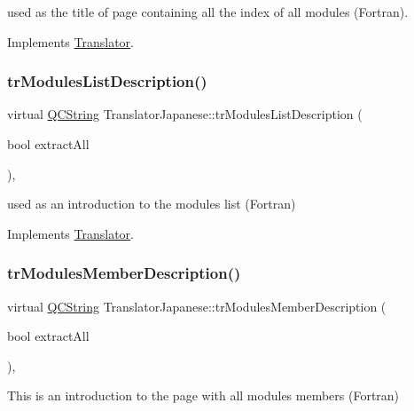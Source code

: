 used as the title of page containing all the index of all modules (Fortran). 

Implements \mbox{\hyperlink{class_translator}{Translator}}.

\mbox{\label{class_translator_japanese_a0d87a4f031ff4b5554c52b998f7f6d1e}} 
\subsubsection{\texorpdfstring{trModulesListDescription()}{trModulesListDescription()}}
{\footnotesize\ttfamily virtual \mbox{\hyperlink{class_q_c_string}{Q\+C\+String}} Translator\+Japanese\+::tr\+Modules\+List\+Description (\begin{DoxyParamCaption}\item[{bool}]{extract\+All }\end{DoxyParamCaption})\hspace{0.3cm}{\ttfamily [inline]}, {\ttfamily [virtual]}}

used as an introduction to the modules list (Fortran) 

Implements \mbox{\hyperlink{class_translator}{Translator}}.

\mbox{\label{class_translator_japanese_ae7648c8c570d99fa6e60725385716b74}} 
\subsubsection{\texorpdfstring{trModulesMemberDescription()}{trModulesMemberDescription()}}
{\footnotesize\ttfamily virtual \mbox{\hyperlink{class_q_c_string}{Q\+C\+String}} Translator\+Japanese\+::tr\+Modules\+Member\+Description (\begin{DoxyParamCaption}\item[{bool}]{extract\+All }\end{DoxyParamCaption})\hspace{0.3cm}{\ttfamily [inline]}, {\ttfamily [virtual]}}

This is an introduction to the page with all modules members (Fortran) 

